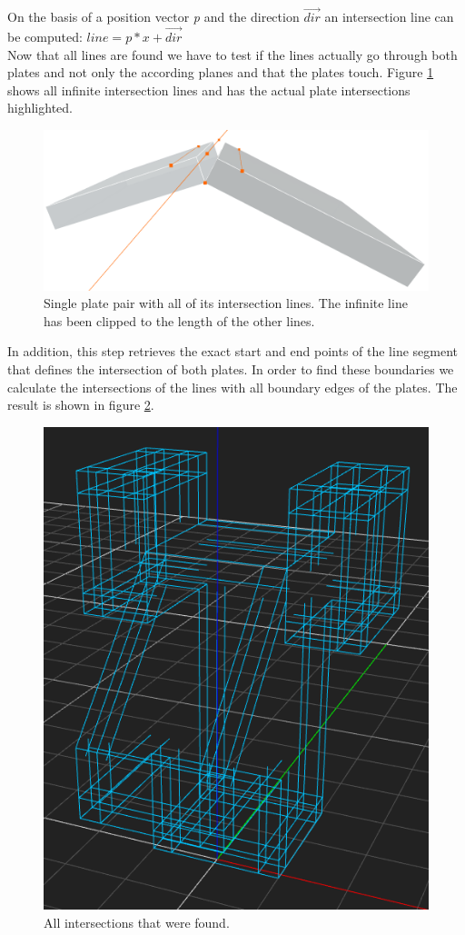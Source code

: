 \documentclass[../ClassicThesis.tex]{subfiles}
\begin{document}
On the basis of a position vector \emph{p} and the direction $\vec{dir}$ an intersection line can be computed: $ line = p*x + \vec{dir}$
\\
Now that all lines are found we have to test if the lines actually go through both plates and not only the according planes and that the plates touch. Figure \ref{fig:infiniteIntersections} shows all infinite intersection lines and has the actual plate intersections highlighted.
\begin{figure}[!ht]
\centering
\includegraphics[width=1\columnwidth]{Images/06-1-graph-fourIntersectionLines.png}
\caption{Single plate pair with all of its intersection lines. The infinite line has been clipped to the length of the other lines.}
\label{fig:infiniteIntersections}
\end{figure}
In addition, this step retrieves the exact start and end points of the line segment that defines the intersection of both plates. In order to find these boundaries we calculate the intersections of the lines with all boundary edges of the plates. The result is shown in figure \ref{fig:allBoundaries}.\\
\begin{figure}[!ht]
\centering
\includegraphics[width=.5\columnwidth]{Images/HeadAllBoundaries.png}
\caption{All intersections that were found. }
\label{fig:allBoundaries}
\end{figure}
\end{document}
